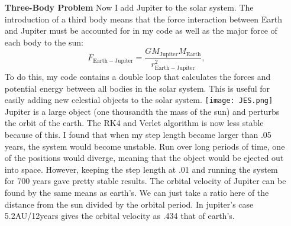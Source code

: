 \documentclass[11pt,a4wide]{article}
\begin{document}
\begin{enumerate}
\item[\bf Three-Body Problem ]
Now I add Jupiter to the solar system. The introduction of a third body means that the force interaction between Earth and Jupiter must be accounted for in my code as well as the major force of each body to the sun:
\[
F_{\mathrm{Earth-Jupiter}}=\frac{GM_{\mathrm{Jupiter}}M_{\mathrm{Earth}}}{r_{\mathrm{Earth-Jupiter}}^2},
\]
To do this, my code contains a double loop that calculates the forces and potential energy between all bodies in the solar system. This is useful for easily adding new celestial objects to the solar system. 
\texttt{[image: JES.png]}\\
Jupiter is a large object (one thousandth the mass of the sun) and perturbs the orbit of the earth. The RK4 and Verlet algorithm is now less stable because of this. I found that when my step length became larger than .05 years, the system would become unstable. Run over long periods of time, one of the positions would diverge, meaning that the object would be ejected out into space. However, keeping the step length at .01 and running the system for 700 years gave pretty stable results. The orbital velocity of Jupiter can be found by the same means as earth's. We can just take a ratio here of the distance from the sun divided by the orbital period. In jupiter's case 5.2AU/12years gives the orbital velocity as .434 that of earth's.  \newline


\end{enumerate}
\end{document}
